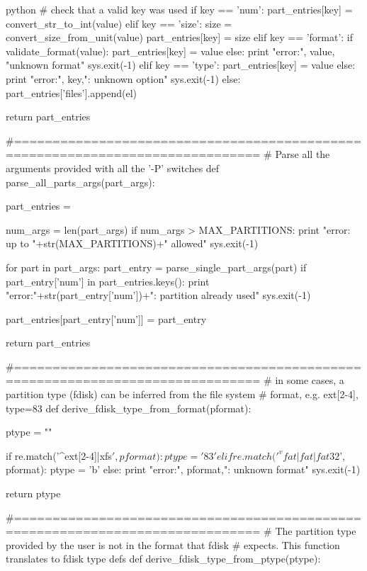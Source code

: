\begin{code-block}{python}
            # check that a valid key was used
            if key == 'num':
                part_entries[key] = convert_str_to_int(value)
            elif key == 'size':
                size = convert_size_from_unit(value)
                part_entries[key] = size
            elif key == 'format':
                if validate_format(value):
                    part_entries[key] = value
                else:
                    print "error:", value, "unknown format"
                    sys.exit(-1)
            elif key == 'type':
                part_entries[key] = value
            else:
                print "error:", key,": unknown option"
                sys.exit(-1)
        else:
            part_entries['files'].append(el)

    return part_entries

#==============================================================================
# Parse all the arguments provided with all the '-P' switches
def parse_all_parts_args(part_args):

    part_entries = {}

    num_args = len(part_args)
    if num_args > MAX_PARTITIONS:
        print "error: up to "+str(MAX_PARTITIONS)+" allowed"
        sys.exit(-1)

    for part in part_args:
        part_entry = parse_single_part_args(part)
        if part_entry['num'] in part_entries.keys():
            print "error:"+str(part_entry['num'])+": partition already used"
            sys.exit(-1)

        part_entries[part_entry['num']] = part_entry

    return part_entries

#==============================================================================
# in some cases, a partition type (fdisk) can be inferred from the file system
# format, e.g. ext[2-4], type=83
def derive_fdisk_type_from_format(pformat):

    ptype = ""

    if re.match('^ext[2-4]|xfs$', pformat):
        ptype = '83'
    elif re.match('^vfat|fat|fat32$', pformat):
        ptype = 'b'
    else:
        print "error:", pformat,": unknown format"
        sys.exit(-1)

    return ptype

#==============================================================================
# The partition type provided by the user is not in the format that fdisk
# expects. This function translates to fdisk type defs
def derive_fdisk_type_from_ptype(ptype):


\end{code-block}
